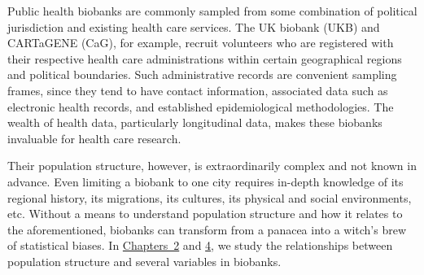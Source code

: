 Public health biobanks are commonly sampled from some combination of political jurisdiction and existing health care services. The UK biobank (UKB) and CARTaGENE (CaG), for example, recruit volunteers who are registered with their respective health care administrations within certain geographical regions and political boundaries\citep{sudlow_uk_2015}\citep{awadalla_cohort_2013}. Such administrative records are convenient sampling frames, since they tend to have contact information, associated data such as electronic health records, and established epidemiological methodologies. The wealth of health data, particularly longitudinal data, makes these biobanks invaluable for health care research. 

Their population structure, however, is extraordinarily complex and not known in advance. Even limiting a biobank to one city requires in-depth knowledge of its regional history, its migrations, its cultures, its physical and social environments, etc. Without a means to understand population structure and how it relates to the aforementioned, biobanks can transform from a panacea into a witch's brew of statistical biases. In \hyperref[chap:chapter2]{Chapters~2} and \hyperref[chap:chapter4]{4}, we study the relationships between population structure and several variables in biobanks.








